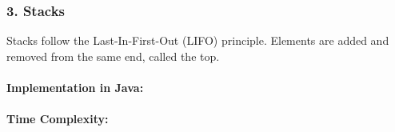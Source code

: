 \hypertarget{stacks}{%
\subsubsection{3. Stacks}\label{stacks}}

Stacks follow the Last-In-First-Out (LIFO) principle. Elements are added
and removed from the same end, called the top.

\hypertarget{implementation-in-java}{%
\paragraph{Implementation in Java:}\label{implementation-in-java}}

\begin{Shaded}
\begin{Highlighting}[]

 
       \NormalTok{(}
        \NormalTok{\textless{}} \NormalTok{\textless{}\textgreater{}();}

\NormalTok{(}\NormalTok{);}
\NormalTok{(}\NormalTok{);}
\NormalTok{(}\NormalTok{);}

        \NormalTok{());  }
        \NormalTok{());  }

        \NormalTok{()); }
\NormalTok{    \}}
\NormalTok{\}}
\end{Highlighting}
\end{Shaded}

\hypertarget{time-complexity-2}{%
\paragraph{Time Complexity:}\label{time-complexity-2}}

